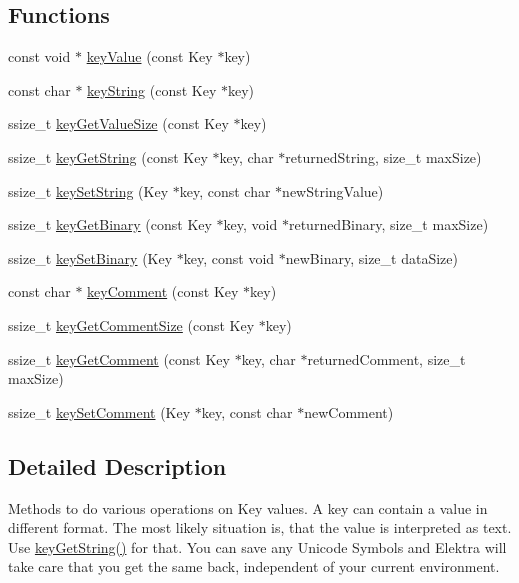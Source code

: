 \subsection*{Functions}
\begin{DoxyCompactItemize}
\item 
const void $\ast$ \hyperlink{group__keyvalue_ga6f29609c5da53c6dc26a98678d5752af}{key\-Value} (const Key $\ast$key)
\item 
const char $\ast$ \hyperlink{group__keyvalue_ga880936f2481d28e6e2acbe7486a21d05}{key\-String} (const Key $\ast$key)
\item 
ssize\-\_\-t \hyperlink{group__keyvalue_gae326672fffb7474abfe9baf53b73217e}{key\-Get\-Value\-Size} (const Key $\ast$key)
\item 
ssize\-\_\-t \hyperlink{group__keyvalue_ga41b9fac5ccddafe407fc0ae1e2eb8778}{key\-Get\-String} (const Key $\ast$key, char $\ast$returned\-String, size\-\_\-t max\-Size)
\item 
ssize\-\_\-t \hyperlink{group__keyvalue_ga622bde1eb0e0c4994728331326340ef2}{key\-Set\-String} (Key $\ast$key, const char $\ast$new\-String\-Value)
\item 
ssize\-\_\-t \hyperlink{group__keyvalue_ga4c0d8a4a11174197699c231e0b5c3c84}{key\-Get\-Binary} (const Key $\ast$key, void $\ast$returned\-Binary, size\-\_\-t max\-Size)
\item 
ssize\-\_\-t \hyperlink{group__keyvalue_gaa50a5358fd328d373a45f395fa1b99e7}{key\-Set\-Binary} (Key $\ast$key, const void $\ast$new\-Binary, size\-\_\-t data\-Size)
\item 
const char $\ast$ \hyperlink{group__keyvalue_gac89fd319783b3457db45b4c09e55274a}{key\-Comment} (const Key $\ast$key)
\item 
ssize\-\_\-t \hyperlink{group__keyvalue_ga0dd737fadc16d4cf16720d17f066a9d3}{key\-Get\-Comment\-Size} (const Key $\ast$key)
\item 
ssize\-\_\-t \hyperlink{group__keyvalue_gafb89735689929ff717cc9f2d0d0b46a2}{key\-Get\-Comment} (const Key $\ast$key, char $\ast$returned\-Comment, size\-\_\-t max\-Size)
\item 
ssize\-\_\-t \hyperlink{group__keyvalue_ga8863a877a84fa46e6017fe72e49b89c1}{key\-Set\-Comment} (Key $\ast$key, const char $\ast$new\-Comment)
\end{DoxyCompactItemize}


\subsection{Detailed Description}
Methods to do various operations on Key values. A key can contain a value in different format. The most likely situation is, that the value is interpreted as text. Use \hyperlink{group__keyvalue_ga41b9fac5ccddafe407fc0ae1e2eb8778}{key\-Get\-String()} for that. You can save any Unicode Symbols and Elektra will take care that you get the same back, independent of your current environment.

